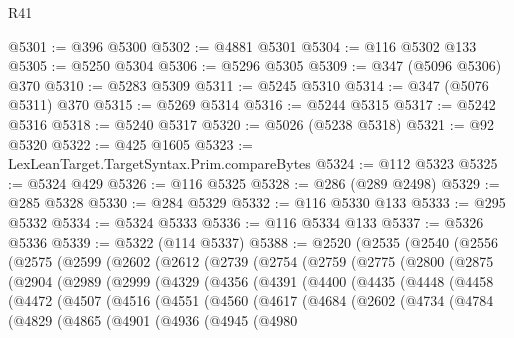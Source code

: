 \begin{lexlean}{R41}
\begin{coremodule}
@5301 := @396 @5300
@5302 := @4881 @5301
@5304 := @116 @5302 @133
@5305 := @5250 @5304
@5306 := @5296 @5305
@5309 := @347 (@5096 @5306) @370
@5310 := @5283 @5309
@5311 := @5245 @5310
@5314 := @347 (@5076 @5311) @370
@5315 := @5269 @5314
@5316 := @5244 @5315
@5317 := @5242 @5316
@5318 := @5240 @5317
@5320 := @5026 (@5238 @5318)
@5321 := @92 @5320
@5322 := @425 @1605
@5323 := LexLeanTarget.TargetSyntax.Prim.compareBytes
@5324 := @112 @5323
@5325 := @5324 @429
@5326 := @116 @5325
@5328 := @286 (@289 @2498)
@5329 := @285 @5328
@5330 := @284 @5329
@5332 := @116 @5330 @133
@5333 := @295 @5332
@5334 := @5324 @5333
@5336 := @116 @5334 @133
@5337 := @5326 @5336
@5339 := @5322 (@114 @5337)
@5388 := @2520
    (@2535
      (@2540
        (@2556
          (@2575
            (@2599
              (@2602
                (@2612
                  (@2739
                    (@2754
                      (@2759
                        (@2775
                          (@2800
                            (@2875
                              (@2904
                                (@2989
                                  (@2999
                                    (@4329
                                      (@4356
                                        (@4391
                                          (@4400
                                            (@4435
                                              (@4448
                                                (@4458
                                                  (@4472
                                                    (@4507
                                                      (@4516
                                                        (@4551
                                                          (@4560
                                                            (@4617
                                                              (@4684
                                                                (@2602
                                                                  (@4734
                                                                    (@4784
                                                                      (@4829
                                                                        (@4865
                                                                          (@4901
                                                                            (@4936
                                                                              (@4945
                                                                                (@4980

\end{coremodule}
\end{lexlean}
